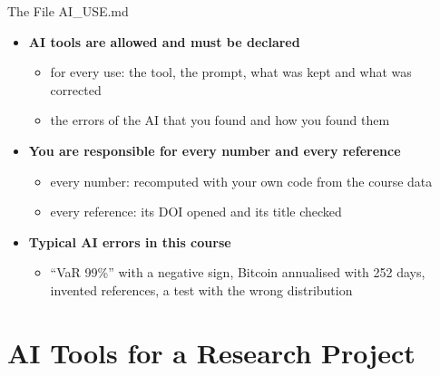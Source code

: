 \begin{frame}{The File AI\_USE.md}
\itemsize{\small}
\begin{itemize}
    \item \textbf{AI tools are allowed and must be declared}
    \begin{itemize}
        \item for every use: the tool, the prompt, what was kept and what was corrected
        \item the errors of the AI that you found and how you found them
    \end{itemize}
    \item \textbf{You are responsible for every number and every reference}
    \begin{itemize}
        \item every number: recomputed with your own code from the course data
        \item every reference: its DOI opened and its title checked
    \end{itemize}
    \item \textbf{Typical AI errors in this course}
    \begin{itemize}
        \item ``VaR 99\%'' with a negative sign, Bitcoin annualised with 252 days, invented references, a test with the wrong distribution
    \end{itemize}
\end{itemize}
\end{frame}


\section{AI Tools for a Research Project}

